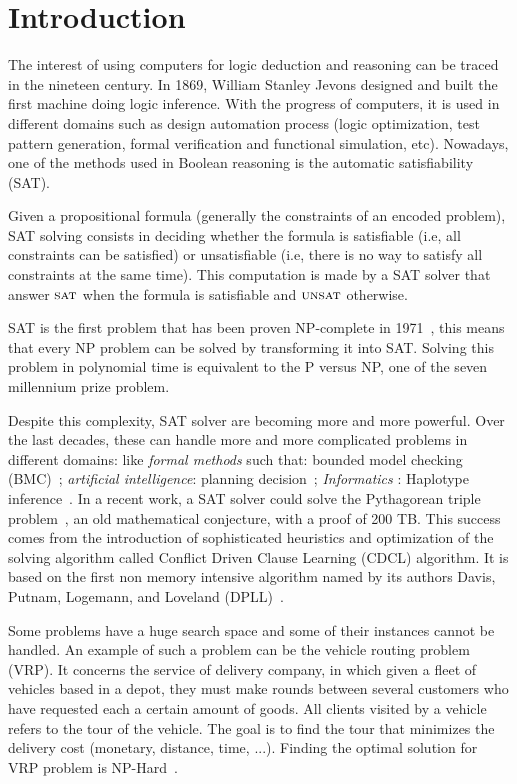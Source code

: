 \chapter{Introduction}\label{chap:intro}


The interest of using computers for logic deduction and reasoning can be traced in the nineteen century.
In 1869,  William Stanley Jevons designed and built the first machine doing logic inference.
With the progress of computers, it is used in different domains such as design automation process 
(logic optimization, test pattern generation, formal verification and functional simulation, etc).
Nowadays, one of the methods used in Boolean reasoning is the automatic satisfiability (SAT).

Given a propositional formula (generally the constraints of an encoded problem),
SAT solving consists in deciding whether the formula is satisfiable (i.e, all constraints can be
satisfied) or unsatisfiable (i.e, there is no way to satisfy all constraints at the same time).
This computation is made by a SAT solver that answer $\textsc{sat}$ when the formula is satisfiable
and $\textsc{unsat}$ otherwise.

SAT is the first problem that has been proven NP-complete in 1971~\cite{cook1971complexity}, this 
means that every NP problem can be solved by transforming it into SAT. Solving this problem in 
polynomial time is equivalent to the P versus NP, one of the seven millennium prize problem.


Despite this complexity, SAT solver are becoming more and more powerful.
Over the last decades, these can handle more and more complicated problems in different domains:
like \emph{formal methods} such that: bounded model checking (BMC)~\cite{bmc_99}; \emph{artificial intelligence}: planning decision~\cite{planning_92}; \emph{Informatics} : Haplotype inference~\cite{biology_06}.
In a recent work, a SAT solver could solve the Pythagorean triple problem~\cite{heule2016solving}, an old mathematical conjecture,
with a proof of 200 TB.
This success comes from the introduction of sophisticated heuristics and optimization of the solving 
algorithm called Conflict Driven Clause Learning (CDCL) algorithm. It is based on the first non memory
intensive algorithm named by its authors Davis, Putnam, Logemann, and Loveland (DPLL)~\cite{dpll_62}.



Some problems have a huge search space and some of their instances cannot be handled.
An example of such a problem can be the vehicle routing problem (VRP).
It concerns the service of delivery company, in which
given a fleet of vehicles based in a depot, they must make rounds between several customers  who have requested
each a certain amount of goods. All clients visited by a vehicle refers to the tour of the vehicle. 
The goal is to find the tour that minimizes the delivery cost (monetary, distance, time, ...).
Finding the optimal solution for VRP problem is NP-Hard~\cite{toth2002vehicle}.

